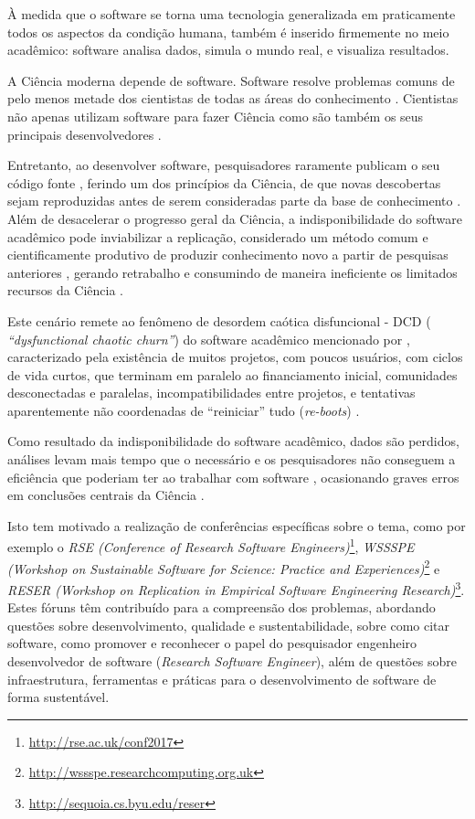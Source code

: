 {À medida que o software se torna uma tecnologia generalizada em praticamente
todos os aspectos da condição humana, também é inserido firmemente no meio
acadêmico: software analisa dados, simula o mundo real, e visualiza
resultados.}
\label{introducao}

A Ciência moderna depende de software. Software resolve problemas comuns de
pelo menos metade dos cientistas de todas as áreas do conhecimento
\cite{wilson2014best}. Cientistas não apenas utilizam software para fazer
Ciência como são também os seus principais desenvolvedores
\cite{goble2014better}.

Entretanto, ao desenvolver software, pesquisadores raramente publicam o seu
código fonte \cite{robles2010replicating, amann2015software}, ferindo um dos
princípios da Ciência, de que novas descobertas sejam reproduzidas antes de
serem consideradas parte da base de conhecimento \cite{stodden2009enabling}.
%
Além de desacelerar o progresso geral da Ciência, a indisponibilidade do
software acadêmico pode inviabilizar a replicação, considerado um  método comum
e cientificamente produtivo de produzir conhecimento novo a partir de pesquisas
anteriores \cite{king1995replication, stodden2010reproducible}, gerando
retrabalho e consumindo de maneira ineficiente os limitados recursos da Ciência
\cite{howison2013incentives, katz2014transitive}.

Este cenário remete ao fenômeno de desordem caótica disfuncional - DCD ({\it
``dysfunctional chaotic churn''}) do software acadêmico mencionado por
, caracterizado pela existência de muitos
projetos, com poucos usuários, com ciclos de vida curtos, que terminam em
paralelo ao financiamento inicial, comunidades desconectadas e paralelas,
incompatibilidades entre projetos, e tentativas aparentemente não coordenadas
de ``reiniciar'' tudo ({\it re-boots}) \cite{howison2015understanding}.

Como resultado da indisponibilidade do software acadêmico, dados são perdidos,
análises levam mais tempo que o necessário e os pesquisadores não conseguem a
eficiência que poderiam ter ao trabalhar com software \cite{wilson2017good},
ocasionando graves erros em conclusões centrais da Ciência
\cite{merali2010computational}.

Isto tem motivado a realização de conferências específicas sobre o tema, como
por exemplo o {\it RSE (Conference of Research Software
Engineers)}\footnote{\url{http://rse.ac.uk/conf2017}}, {\it WSSSPE (Workshop on
Sustainable Software for Science: Practice and
Experiences)}\footnote{\url{http://wssspe.researchcomputing.org.uk}} e {\it
RESER (Workshop on Replication in Empirical Software Engineering
Research)}\footnote{\url{http://sequoia.cs.byu.edu/reser}}.  Estes fóruns têm
contribuído para a compreensão dos problemas, abordando questões sobre
desenvolvimento, qualidade e sustentabilidade, sobre como citar software, como
promover e reconhecer o papel do pesquisador engenheiro desenvolvedor de
software ({\it Research Software Engineer}), além de questões sobre
infraestrutura, ferramentas e práticas para o desenvolvimento de software de
forma sustentável.

